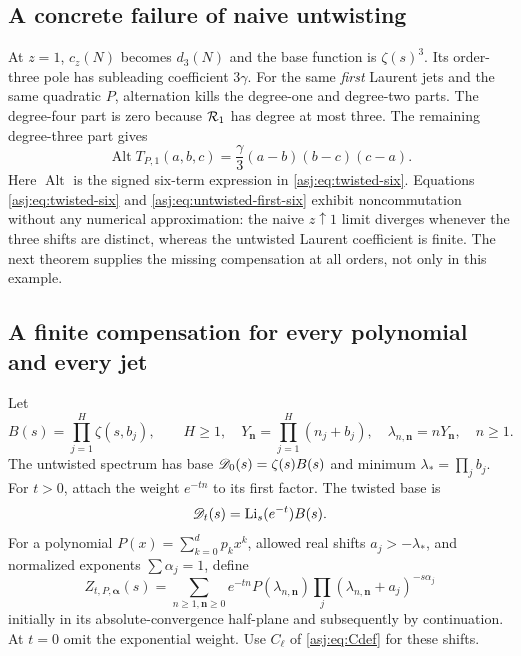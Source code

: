 \subsection{A concrete failure of naive untwisting}
At $z=1$, $c_z(N)$ becomes $d_3(N)$ and the base function is $\zeta(s)^3$.
Its order-three pole has subleading coefficient $3\gamma$. For the same
\emph{first} Laurent jets and the same quadratic $P$, alternation kills
the degree-one and degree-two parts. The degree-four part is zero because
$\mathcal R_1$ has degree at most three. The remaining degree-three part gives
\begin{equation}\label{asj:eq:untwisted-first-six}
 \operatorname{Alt}T_{P,1}(a,b,c)
           =\frac\gamma3(a-b)(b-c)(c-a).
\end{equation}
Here $\operatorname{Alt}$ is the signed six-term expression in
\eqref{asj:eq:twisted-six}. Equations \eqref{asj:eq:twisted-six} and
\eqref{asj:eq:untwisted-first-six} exhibit noncommutation without any
numerical approximation: the naive $z\uparrow1$ limit diverges whenever
the three shifts are distinct, whereas the untwisted Laurent coefficient
is finite. The next theorem supplies the missing compensation at all
orders, not only in this example.

\subsection{A finite compensation for every polynomial and every jet}
Let
\[
 B(s)=\prod_{j=1}^H\zeta(s,b_j),\qquad H\ge1,
 \quad Y_{\boldsymbol n}=\prod_{j=1}^H(n_j+b_j),
 \quad \lambda_{n,\boldsymbol n}=nY_{\boldsymbol n},\quad n\ge1.
\]
The untwisted spectrum has base $\mathscr D_0(s)=\zeta(s)B(s)$ and minimum
$\lambda_* =\prod_jb_j$. For $t>0$, attach the weight $e^{-tn}$ to its
first factor. The twisted base is
\[
 \mathscr D_t(s)=\operatorname{Li}_s(e^{-t})B(s).
\]
For a polynomial $P(x)=\sum_{k=0}^d p_kx^k$, allowed real shifts
$a_j>-\lambda_*$, and normalized exponents $\sum\alpha_j=1$, define
\begin{equation}\label{asj:eq:Zt}
 Z_{t,P,\boldsymbol\alpha}(s)
   =\sum_{n\ge1,\boldsymbol n\ge0}
       e^{-tn}P(\lambda_{n,\boldsymbol n})
         \prod_j(\lambda_{n,\boldsymbol n}+a_j)^{-s\alpha_j}
\end{equation}
initially in its absolute-convergence half-plane and subsequently by
continuation. At $t=0$ omit the exponential weight. Use $C_\ell$ of
\eqref{asj:eq:Cdef} for these shifts.

